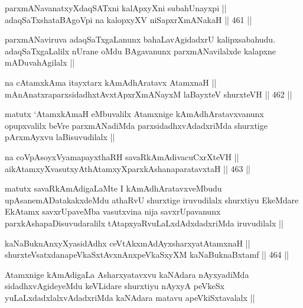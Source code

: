

\begin{shl}
parxmANavanatxyXdaqSATxni kalApxyXni subahUnayxpi || \\
adaqSaTxshataBAgoV\s pi na kalopxyXV niSapxrXmANakaH ||  461 ||  
\end{shl}

\begin{artha}
parxmANaviruva adaqSaTxgaLanunx bahaLavAgidadxrU
kalipxsabahudu. adaqSaTxgaLalilx nUrane oMdu BAgavanunx
parxmANavilalxde kalapxne mADuvahAgilalx ||
\end{artha}

\begin{shl}
na cA\s \s tamxkAma itayxtarx kAmAdhAratavx AtamxnaH || \\
mAnAnatxraparxsidadhxtAvxtApxrXmANayxM laBayxteV shurxteVH ||  462 ||  
\end{shl}

\begin{artha}
matutx `AtamxkAmaH eMbuvalilx Atamxnige kAmAdhAratavxvanunx
opupxvalilx beVre parxmANadiMda parxsidadhxvAdadxriMda shurxtige
pArxmAyxvu laBisuvudilalx ||
\end{artha}

\begin{shl}
na coVpAsoyxV\s yamapayxthaRH savaRkAmAdivacuCxrXteVH || \\
aikAtamxyXvasutxyAthAtamxyXparxkAshanaparatavxtaH ||  463 ||  
\end{shl}

\begin{artha}
matutx savaRkAmAdigaLaMte I kAmAdhAratavxveMbudu
upAsanemADatakakxdeMdu athaRvU shurxtige iruvudilalx shurxtiyu
EkeMdare EkAtamx savxrUpaveMba vasutxvina nija savxrUpavanunx
parxkAshapaDisuvudaralilx tAtapxyaRvuLaLxdAdxdadxriMda iruvudilalx ||
\end{artha}


\begin{shl}
kaNaBuknAnxyXyasidAdhx ceVtAkxmAdAyxsharxyatA\s \s tamxnaH || \\
shurxteVsatxdanapeVkaSxtAvxnAnxpeVkaSxyXM kaNaBuknaBxtamf ||  464 ||  
\end{shl}

\begin{artha}
Atamxnige kAmAdigaLa Asharxyatavxvu kaNAdara nAyxyadiMda
sidadhxvAgideyeMdu keVLidare shurxtiyu nAyxyA peVkeSx
yuLaLxdadxlalxvAdadxriMda kaNAdara matavu apeVkiSxtavalalx ||
\end{artha}

